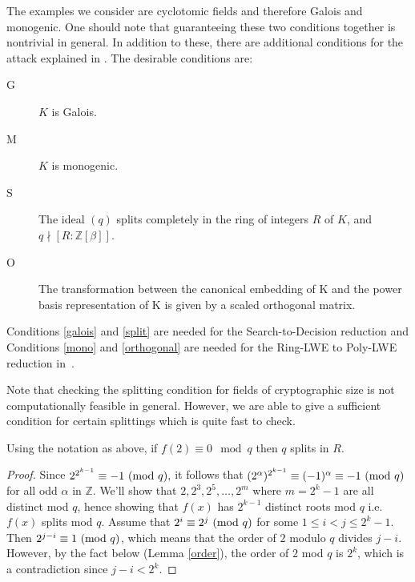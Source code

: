 \documentclass{llncs}
\newcommand{\MOD}[1]{~(\textup{mod}~#1)}
\renewcommand{\pmod}{\MOD}
\newcommand{\<}{\langle}
\renewcommand{\>}{\rangle}
\begin{document}
\vspace{0.25em}

The examples we consider are cyclotomic fields and therefore Galois and monogenic. One should note that guaranteeing these two conditions together is nontrivial in general. In addition to these, there are additional conditions for the attack explained in \cite{EHL}.  The desirable conditions are:
\vspace{0.5em}

\begin{minipage}[b]{0.90\linewidth}
\begin{description}
        \item[G\label{galois}] $K$ is Galois.
        \item[M\label{mono}] $K$ is monogenic.
\item[S\label{split}] The ideal $(q)$ splits completely in the ring of integers $R$ of $K$, and $q \nmid [R:\mathbb Z[\beta]]$.
\item[O\label{orthogonal}] The transformation between the canonical embedding of K and the power basis representation of K is given by a scaled orthogonal matrix.
\end{description}
\end{minipage}

\vspace{0.25em}



Conditions \ref{galois} and \ref{split} are needed for the Search-to-Decision reduction and Conditions \ref{mono} and \ref{orthogonal} are needed for the Ring-LWE to Poly-LWE reduction in~\cite{EHL}.




Note that checking the splitting condition for fields of cryptographic size is not computationally feasible in general.  However, we are able to give a sufficient condition for certain splittings which is quite fast to check.

\begin{proposition} \label{easysplit}
Using the notation as above, if $f(2) \equiv 0 \mod q$ then $q$ splits in $R.$
\end{proposition}

\begin{proof}
Since $2^{2^{k-1}} \equiv -1 \pmod q,$ it follows that $(2^\alpha)^{2^{k-1}}\equiv (-1)^\alpha \equiv -1 \pmod q$ for all odd $\alpha$ in $\mathbb Z$. We'll show that $2,2^3, 2^5, \ldots, 2^m$ where $m=2^k-1$ are all distinct mod $q$, hence showing that $f(x)$ has $2^{k-1}$ distinct roots mod $q$ i.e. $f(x)$ splits mod $q$.
Assume that $2^i \equiv 2^j \pmod q$ for some $1\leq i< j \leq 2^k-1$. Then $2^{j-i} \equiv 1 \pmod q$, which means that the order of $2$ modulo $q$ divides $j-i$. However, by the fact below (Lemma \ref{order}),  the order of $2$ mod $q$ is $2^k$, which is a contradiction since $j-i< 2^k.$
\end{proof}
\end{document}
